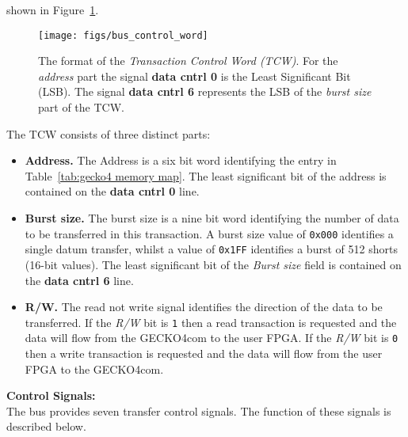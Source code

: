 shown in Figure~\ref{fig:TCW}.
\begin{figure}[b]
\centering%
\texttt{[image: figs/bus\_control\_word]}
\caption{The format of the \emph{Transaction Control Word (TCW)}. For the
\emph{address} part the signal \textbf{data cntrl 0} is the Least Significant Bit
(LSB). The signal \textbf{data cntrl 6} represents the LSB of the \emph{burst size}
part of the TCW.}
\label{fig:TCW}
\end{figure}
The TCW consists of three distinct parts:
\begin{itemize}
\item \textbf{Address.} The Address is a six bit word identifying the entry in
Table~\ref{tab:gecko4 memory map}. The least significant bit of the address is
contained on the \textbf{data cntrl 0} line.
\item \textbf{Burst size.} The burst size is a nine bit word identifying the
number of data to be transferred in this transaction. A burst size value of
\verb+0x000+ identifies a single datum transfer, whilst a value of \verb+0x1FF+
identifies a burst of 512 shorts (16-bit values). The least significant bit of
the \emph{Burst size} field is contained on the \textbf{data cntrl 6} line.
\item \textbf{R/W.} The read not write signal identifies the direction of the
data to be transferred. If the \emph{R/W} bit is \verb+1+ then a read
transaction is requested and the data will flow from the {\sc GECKO4com} to the
user FPGA. If the \emph{R/W} bit is \verb+0+ then a write
transaction is requested and the data will flow from the user FPGA to the
{\sc GECKO4com}. 
\end{itemize}
\textbf{Control Signals:}\\
The bus provides seven transfer control signals. The function of these
signals is described below.
